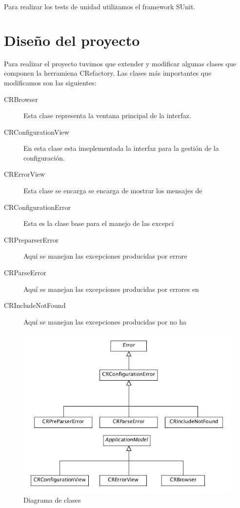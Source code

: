 \documentclass[a4paper,oneside,12pt]{article}
\begin{document}
Para realizar los tests de unidad utilizamos el framework SUnit.

\section{Diseño del proyecto}
Para realizar el proyecto tuvimos que extender y modificar algunas clases que componen la herramiena CRefactory. Las clases m\'as importantes que modificamos son las siguientes:

\begin{description}
\item[CRBrowser] Esta clase representa la ventana principal de la interfaz.
\item[CRConfigurationView] En esta clase esta imeplementada la interfaz para la gesti\'on de la configuraci\'on.
\item[CRErrorView] Esta clase se encarga se encarga de mostrar los mensajes de 
\item[CRConfigurationError] Esta es la clase base para el manejo de las excepci
\item[CRPreparserError] Aqu\'i se manejan las excepciones producidas por errore
\item[CRParseError] Aqu\'i se manejan las excepciones producidas por errores en
\item[CRIncludeNotFound] Aqu\'i se manejan las excepciones producidas por no ha
\end{description}


\begin{figure}[h!]
  \centering
    \includegraphics[scale=0.6]{images/diagrama_de_clases.jpg}
    \caption{Diagrama de clases}
    \label{diagrama_de_clases}
\end{figure}
\end{document}
